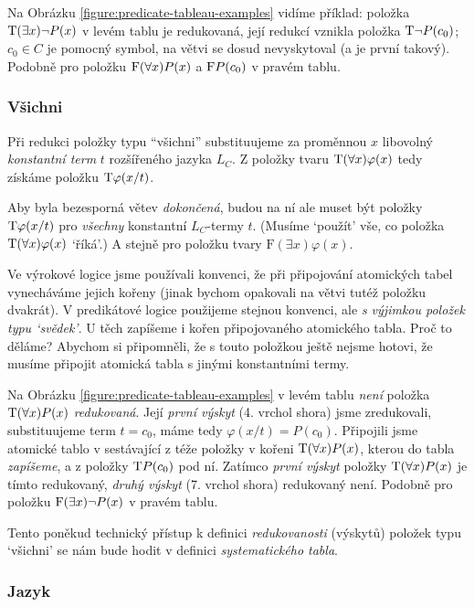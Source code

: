 Na Obrázku \ref{figure:predicate-tableau-examples} vidíme příklad: položka $\mathrm{T}(\exists x)\neg P(x)$ v levém tablu je redukovaná, její redukcí vznikla položka $\mathrm{T}\neg P(c_0)$; $c_0\in C$ je pomocný symbol, na větvi se dosud nevyskytoval (a je první takový). Podobně pro položku $\mathrm{F}(\forall x)P(x)$ a $\mathrm{F} P(c_0)$ v pravém tablu.

\subsubsection{Všichni}
Při redukci položky typu ``všichni'' substituujeme za proměnnou $x$ libovolný \emph{konstantní term} $t$ rozšířeného jazyka $L_C$. Z položky tvaru $\mathrm{T}(\forall x)\varphi(x)$ tedy získáme položku $\mathrm{T}\varphi(x/t)$. 

Aby byla bezesporná větev \emph{dokončená}, budou na ní ale muset být položky $\mathrm{T}\varphi(x/t)$ pro \emph{všechny} konstantní $L_C$-termy $t$. (Musíme `použít' vše, co položka $\mathrm{T}(\forall x)\varphi(x)$ `říká'.) A stejně pro položku tvary $\mathrm{F}(\exists x)\varphi(x)$.

Ve výrokové logice jsme používali konvenci, že při připojování atomických tabel vynecháváme jejich kořeny (jinak bychom opakovali na větvi tutéž položku dvakrát). V predikátové logice použijeme stejnou konvenci, ale \emph{s výjimkou položek typu `svědek'}. U těch zapíšeme i kořen připojovaného atomického tabla. Proč to děláme? Abychom si připomněli, že s touto položkou ještě nejsme hotovi, že musíme připojit atomická tabla s jinými konstantními termy.

Na Obrázku \ref{figure:predicate-tableau-examples} v levém tablu \emph{není} položka $\mathrm{T}(\forall x)P(x)$ \emph{redukovaná}. Její \emph{první výskyt} (4. vrchol shora) jsme zredukovali, substituujeme term $t=c_0$, máme tedy $\varphi(x/t)=P(c_0)$. Připojili jsme atomické tablo v sestávající z téže položky v kořeni $\mathrm{T}(\forall x)P(x)$, kterou do tabla \emph{zapíšeme}, a z položky $\mathrm{T} P(c_0)$ pod ní. Zatímco \emph{první výskyt} položky $\mathrm{T}(\forall x)P(x)$ je tímto redukovaný, \emph{druhý výskyt} (7. vrchol shora) redukovaný není. Podobně pro položku $\mathrm{F}(\exists x)\neg P(x)$ v pravém tablu.

Tento poněkud technický přístup k definici \emph{redukovanosti} (výskytů) položek typu `všichni' se nám bude hodit v definici \emph{systematického tabla}.

\subsubsection{Jazyk}

